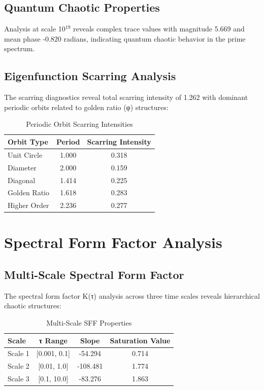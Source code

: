 \documentclass[11pt,a4paper]{article}
\begin{document}
\subsection{Quantum Chaotic Properties}

Analysis at scale 10$^{19}$ reveals complex trace values with magnitude 5.669 and mean phase -0.820 radians, indicating quantum chaotic behavior in the prime spectrum.

\subsection{Eigenfunction Scarring Analysis}

The scarring diagnostics reveal total scarring intensity of 1.262 with dominant periodic orbits related to golden ratio (φ) structures:

\begin{table}[H]
\centering
\caption{Periodic Orbit Scarring Intensities}
\label{tab:scarring}
\begin{tabular}{@{}lcc@{}}
\toprule
Orbit Type & Period & Scarring Intensity \\
\midrule
Unit Circle & 1.000 & 0.318 \\
Diameter & 2.000 & 0.159 \\
Diagonal & 1.414 & 0.225 \\
Golden Ratio & 1.618 & 0.283 \\
Higher Order & 2.236 & 0.277 \\
\bottomrule
\end{tabular}
\end{table}

\section{Spectral Form Factor Analysis}

\subsection{Multi-Scale Spectral Form Factor}

The spectral form factor K(τ) analysis across three time scales reveals hierarchical chaotic structures:

\begin{table}[H]
\centering
\caption{Multi-Scale SFF Properties}
\label{tab:multi_scale_sff}
\begin{tabular}{@{}lccc@{}}
\toprule
Scale & τ Range & Slope & Saturation Value \\
\midrule
Scale 1 & [0.001, 0.1] & -54.294 & 0.714 \\
Scale 2 & [0.01, 1.0] & -108.481 & 1.774 \\
Scale 3 & [0.1, 10.0] & -83.276 & 1.863 \\
\bottomrule
\end{tabular}
\end{table}
\end{document}
